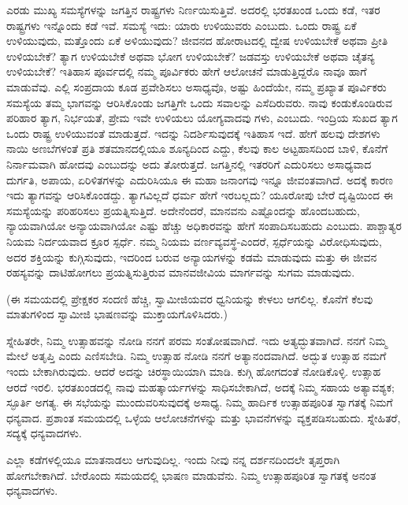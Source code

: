 ಎರಡು ಮುಖ್ಯ ಸಮಸ್ಯೆಗಳನ್ನು ಜಗತ್ತಿನ ರಾಷ್ಟ್ರಗಳು ನಿರ್ಣಯಿಸುತ್ತಿವೆ. ಅದರಲ್ಲಿ ಭರತಖಂಡ ಒಂದು ಕಡೆ, ಇತರ ರಾಷ್ಟ್ರಗಳು ಇನ್ನೊಂದು ಕಡೆ ಇವೆ. ಸಮಸ್ಯೆ ಇದು: ಯಾರು ಉಳಿಯುವರು ಎಂಬುದು. ಒಂದು ರಾಷ್ಟ್ರ ಏಕೆ ಉಳಿಯುವುದು, ಮತ್ತೊಂದು ಏಕೆ ಅಳಿಯುವುದು? ಜೀವನದ ಹೋರಾಟದಲ್ಲಿ ದ್ವೇಷ ಉಳಿಯಬೇಕೆ ಅಥವಾ ಪ್ರೀತಿ ಉಳಿಯಬೇಕೆ? ತ್ಯಾಗ ಉಳಿಯಬೇಕೆ ಅಥವಾ ಭೋಗ ಉಳಿಯಬೇಕೆ? ಜಡವಸ್ತು ಉಳಿಯಬೇಕೆ ಅಥವಾ ಚೈತನ್ಯ ಉಳಿಯಬೇಕೆ? ಇತಿಹಾಸ ಪೂರ್ವದಲ್ಲಿ ನಮ್ಮ ಪೂರ್ವಿಕರು ಹೇಗೆ ಆಲೋಚನೆ ಮಾಡುತ್ತಿದ್ದರೊ ನಾವೂ ಹಾಗೆ ಮಾಡುವೆವು. ಎಲ್ಲಿ ಸಂಪ್ರದಾಯ ಕೂಡ ಪ್ರವೇಶಿಸಲು ಅಸಾಧ್ಯವೊ, ಅಷ್ಟು ಹಿಂದೆಯೇ, ನಮ್ಮ ಪ್ರಖ್ಯಾತ ಪೂರ್ವಿಕರು ಸಮಸ್ಯೆಯ ತಮ್ಮ ಭಾಗವನ್ನು ಆರಿಸಿಕೊಂಡು ಜಗತ್ತಿಗೇ ಒಂದು ಸವಾಲನ್ನು ಎಸೆದಿರುವರು. ನಾವು ಕಂಡುಕೊಂಡಿರುವ ಪರಿಹಾರ ತ್ಯಾಗ, ನಿರ್ಭಯತೆ, ಪ್ರೇಮ ಇವೇ ಉಳಿಯಲು ಯೋಗ್ಯವಾದವು ಗಳು, ಎಂಬುದು. ಇಂದ್ರಿಯ ಸುಖದ ತ್ಯಾಗ ಒಂದು ರಾಷ್ಟ್ರ ಉಳಿಯುವಂತೆ ಮಾಡುತ್ತದೆ. ಇದನ್ನು ನಿದರ್ಶಿಸುವುದಕ್ಕೆ ಇತಿಹಾಸ ಇದೆ. ಹೇಗೆ ಹಲವು ದೇಶಗಳು ನಾಯಿ ಅಣಬೆಗಳಂತೆ ಪ್ರತಿ ಶತಮಾನದಲ್ಲಿಯೂ ಶೂನ್ಯದಿಂದ ಎದ್ದು, ಕೆಲವು ಕಾಲ ಅಟ್ಟಹಾಸದಿಂದ ಬಾಳಿ, ಕೊನೆಗೆ ನಿರ್ನಾಮವಾಗಿ ಹೋದವು ಎಂಬುದನ್ನು ಅದು ತೋರುತ್ತದೆ. ಜಗತ್ತಿನಲ್ಲಿ ಇತರರಿಗೆ ಎದುರಿಸಲು ಅಸಾಧ್ಯವಾದ ದುರ್ಗತಿ, ಅಪಾಯ, ಏರಿಳಿತಗಳನ್ನು ಎದುರಿಸಿಯೂ ಈ ಮಹಾ ಜನಾಂಗವು ಇನ್ನೂ ಜೀವಂತವಾಗಿದೆ. ಅದಕ್ಕೆ ಕಾರಣ ಇದು ತ್ಯಾಗವನ್ನು ಆರಿಸಿಕೊಂಡದ್ದು. ತ್ಯಾಗವಿಲ್ಲದೆ ಧರ್ಮ ಹೇಗೆ ಇರಬಲ್ಲದು? ಯೂರೋಪು ಬೇರೆ ದೃಷ್ಟಿಯಿಂದ ಈ ಸಮಸ್ಯೆಯನ್ನು ಪರಿಹರಿಸಲು ಪ್ರಯತ್ನಿಸುತ್ತಿದೆ. ಅದೇನೆಂದರೆ, ಮಾನವನು ಎಷ್ಟೊಂದನ್ನು ಹೊಂದಬಹುದು, ನ್ಯಾಯವಾಗಿಯೋ ಅನ್ಯಾಯವಾಗಿಯೋ ಎಷ್ಟು ಹೆಚ್ಚು ಅಧಿಕಾರವನ್ನು ಹೇಗೆ ಸಂಪಾದಿಸಬಹುದು ಎಂಬುದು. ಪಾಶ್ಚಾತ್ಯರ ನಿಯಮ ನಿರ್ದಯವಾದ ಕ್ರೂರ ಸ್ಪರ್ಧೆ. ನಮ್ಮ ನಿಯಮ ವರ್ಣವ್ಯವಸ್ಥೆ-ಎಂದರೆ, ಸ್ಪರ್ಧೆಯನ್ನು ವಿರೋಧಿಸುವುದು, ಅದರ ಶಕ್ತಿಯನ್ನು ಕುಗ್ಗಿಸುವುದು, ಇದರಿಂದ ಬರುವ ಅನ್ಯಾಯಗಳನ್ನು ಕಡಮೆ ಮಾಡುವುದು ಮತ್ತು ಈ ಜೀವನ ರಹಸ್ಯವನ್ನು ದಾಟಿಹೋಗಲು ಪ್ರಯತ್ನಿಸುತ್ತಿರುವ ಮಾನವಜೀವಿಯ ಮಾರ್ಗವನ್ನು ಸುಗಮ ಮಾಡುವುದು.

(ಈ ಸಮಯದಲ್ಲಿ ಪ್ರೇಕ್ಷಕರ ಸಂದಣಿ ಹೆಚ್ಚಿ, ಸ್ವಾಮೀಜಿಯವರ ಧ್ವನಿಯನ್ನು ಕೇಳಲು ಆಗಲಿಲ್ಲ. ಕೊನೆಗೆ ಕೆಲವು ಮಾತುಗಳಿಂದ ಸ್ವಾಮೀಜಿ ಭಾಷಣವನ್ನು ಮುಕ್ತಾಯಗೊಳಿಸಿದರು.)

ಸ್ನೇಹಿತರೇ, ನಿಮ್ಮ ಉತ್ಸಾಹವನ್ನು ನೋಡಿ ನನಗೆ ಪರಮ ಸಂತೋಷವಾಗಿದೆ. ಇದು ಅತ್ಯದ್ಭುತವಾಗಿದೆ. ನನಗೆ ನಿಮ್ಮ ಮೇಲೆ ಅತೃಪ್ತಿ ಎಂದು ಎಣಿಸಬೇಡಿ. ನಿಮ್ಮ ಉತ್ಸಾಹ ನೋಡಿ ನನಗೆ ಅತ್ಯಾನಂದವಾಗಿದೆ. ಅದ್ಭುತ ಉತ್ಸಾಹ ನಮಗೆ ಇಂದು ಬೇಕಾಗಿರುವುದು. ಆದರೆ ಅದನ್ನು ಚಿರಸ್ಥಾಯಿಯಾಗಿ ಮಾಡಿ. ಕುಗ್ಗಿ ಹೋಗದಂತೆ ನೋಡಿಕೊಳ್ಳಿ. ಉತ್ಸಾಹ ಆರದೆ ಇರಲಿ. ಭರತಖಂಡದಲ್ಲಿ ನಾವು ಮಹತ್ಕಾರ್ಯಗಳನ್ನು ಸಾಧಿಸಬೇಕಾಗಿದೆ, ಅದಕ್ಕೆ ನಿಮ್ಮ ಸಹಾಯ ಅತ್ಯಾವಶ್ಯಕ; ಸ್ಫೂರ್ತಿ ಅಗತ್ಯ. ಈ ಸಭೆಯನ್ನು ಮುಂದುವರಿಸುವುದಕ್ಕೆ ಅಸಾಧ್ಯ. ನಿಮ್ಮ ಹಾರ್ದಿಕ ಉತ್ಸಾಹಪೂರಿತ ಸ್ವಾಗತಕ್ಕೆ ನಿಮಗೆ ಧನ್ಯವಾದ. ಪ್ರಶಾಂತ ಸಮಯದಲ್ಲಿ ಒಳ್ಳೆಯ ಆಲೋಚನೆಗಳನ್ನು ಮತ್ತು ಭಾವನೆಗಳನ್ನು ವ್ಯಕ್ತಪಡಿಸಬಹುದು. ಸ್ನೇಹಿತರೆ, ಸದ್ಯಕ್ಕೆ ಧನ್ಯವಾದಗಳು.

ಎಲ್ಲಾ ಕಡೆಗಳಲ್ಲಿಯೂ ಮಾತನಾಡಲು ಆಗುವುದಿಲ್ಲ. ಇಂದು ನೀವು ನನ್ನ ದರ್ಶನದಿಂದಲೇ ತೃಪ್ತರಾಗಿ ಹೋಗಬೇಕಾಗಿದೆ. ಬೇರೊಂದು ಸಮಯದಲ್ಲಿ ಭಾಷಣ ಮಾಡುವೆನು. ನಿಮ್ಮ ಉತ್ಸಾಹಪೂರಿತ ಸ್ವಾಗತಕ್ಕೆ ಅನಂತ ಧನ್ಯವಾದಗಳು.

